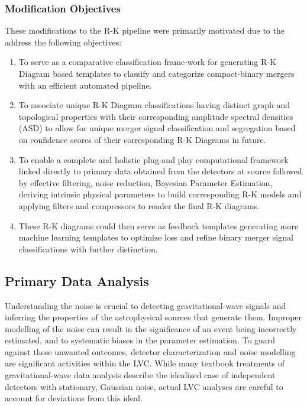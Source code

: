    \subsubsection{Modification Objectives}
    These modifications to the R-K pipeline were primarily motivated due to the address the following objectives:
    \begin{enumerate}
        \item To serve as a comparative classification frame-work for generating R-K Diagram based templates to classify and categorize compact-binary mergers with an efficient automated pipeline.
        \item To associate unique R-K Diagram classifications having distinct graph and topological properties with their  corresponding amplitude spectral densities (ASD) to allow for unique merger signal classification and segregation based on confidence scores of their corresponding R-K Diagrams in future.
        \item To enable a complete and holistic plug-and play computational framework linked directly to  primary data obtained from the detectors at source followed by effective filtering, noise reduction, Bayesian Parameter Estimation, deriving intrinsic physical parameters to build corresponding R-K models and applying filters and compressors to render the final R-K diagrams.
        \item These R-K diagrams could then serve as feedback templates generating more machine learning templates to optimize loss and refine binary merger signal classifications with further distinction.
    \end{enumerate}

    \subsection{Primary Data Analysis}

    Understanding the noise is crucial to detecting gravitational-wave signals and inferring the properties of the astrophysical sources that generate them. Improper modelling of the noise can result in the significance of an event being incorrectly estimated, and to systematic biases in the parameter estimation. To guard against these unwanted outcomes, detector characterization and noise modelling are significant activities within the LVC.\cite{00.5_GWDetectionNoiseCatalogue} While many textbook treatments of gravitational-wave data analysis describe the idealized case of independent detectors with stationary, Gaussian noise, actual LVC analyses are careful to account for deviations from this ideal.\cite{00.1_2012GWAnalysisFormalism} \cite{00.3_GravitationalWaveResearch}

